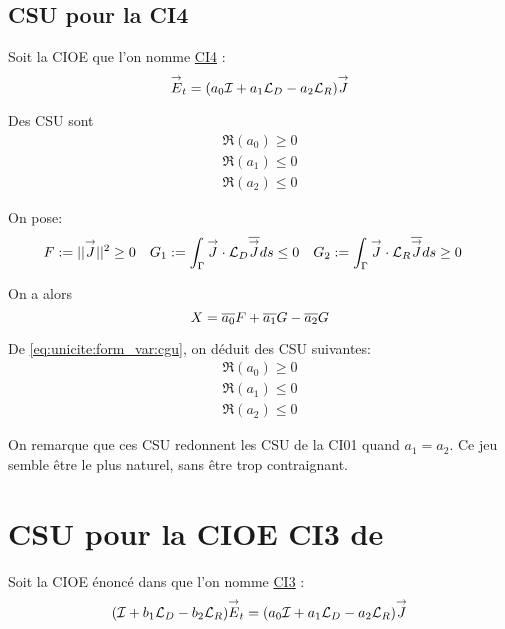 \subsection{CSU pour la CI4}
  Soit la CIOE que l'on nomme \hyperlink{ci4}{CI4} :
  \begin{equation}
    \label{eq:unicite:ci4:ci4}
    {\overset{\rightarrow}{E}}_t = (a_0{\mathcal{I}} + a_1 {\mathcal{L}_D} - a_2 {\mathcal{L}_R} ) {\overset{\rightarrow}{J}}
  \end{equation}

  \begin{prop}
    Des CSU sont
    \begin{align}
      \Re(a_0) \ge 0
      \\
      \Re(a_1) \le 0
      \\
      \Re(a_2) \le 0
    \end{align}
  \end{prop}

  \begin{prop}
    On pose:
    \begin{align*}
      F &:= ||{\overset{\rightarrow}{J}}|| ^2 \ge 0  & G_1 &:= \int_\Gamma {\overset{\rightarrow}{J}}\cdot {\mathcal{L}_D}{\overline{{\overset{\rightarrow}{J}}}} ds \le 0 & G_2 &:= \int_\Gamma {\overset{\rightarrow}{J}}\cdot {\mathcal{L}_R}{\overline{{\overset{\rightarrow}{J}}}} ds \ge 0
    \end{align*}

    On a alors
    \begin{equation*}
      X = {\overline{a_0}}F + {\overline{a_1}}G - {\overline{a_2}}G
    \end{equation*}

    De \eqref{eq:unicite:form_var:cgu}, on déduit des CSU suivantes:
    \begin{align}
      \Re\left(a_0\right) \ge 0
      \\
      \Re\left(a_1\right) \le 0
      \\
      \Re\left(a_2\right) \le 0
    \end{align}
  \end{prop}

  On remarque que ces CSU redonnent les CSU de la CI01 quand \(a_1=a_2\). Ce jeu semble être le plus naturel, sans être trop contraignant.

\section{CSU pour la CIOE CI3 de \cite{aubakirov_electromagnetic_2014}}

  Soit la CIOE énoncé dans \cite{aubakirov_electromagnetic_2014} que l'on nomme \hyperlink{ci3}{CI3} :
  \begin{equation}
    \label{eq:unicite:ci3:ci3}
    ( {\mathcal{I}} + b_1 {\mathcal{L}_D} - b_2 {\mathcal{L}_R}){\overset{\rightarrow}{E}}_t = (a_0{\mathcal{I}} + a_1 {\mathcal{L}_D} - a_2 {\mathcal{L}_R} ) {\overset{\rightarrow}{J}}
  \end{equation}

